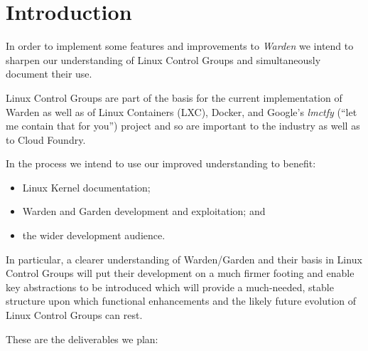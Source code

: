 \documentclass[a4paper,twoside,12pt]{article}
\begin{document}
\clearpage
{}

\section{Introduction}

In order to implement some features and improvements to \emph{Warden} we intend to sharpen our understanding of Linux Control Groups and simultaneously document their use.

Linux Control Groups are part of the basis for the current implementation of Warden as well as of Linux Containers (LXC), Docker, and Google's
\textit{lmctfy} (``let me contain that for you'') project and so are important to the industry as well as to Cloud
Foundry.

In the process we intend to use our improved understanding to benefit:
\begin{itemize}
\item Linux Kernel documentation;
\item Warden \cite{warden} and Garden \cite{garden} development and exploitation; and
\item the wider development audience.
\end{itemize}
In particular, a clearer understanding of Warden/Garden and their basis in Linux Control Groups will put their development 
on a much firmer footing and enable key abstractions to be introduced which will provide a much-needed, stable structure upon which
functional enhancements and the likely future evolution of Linux Control Groups can rest.

These are the deliverables we plan:
\end{document}
